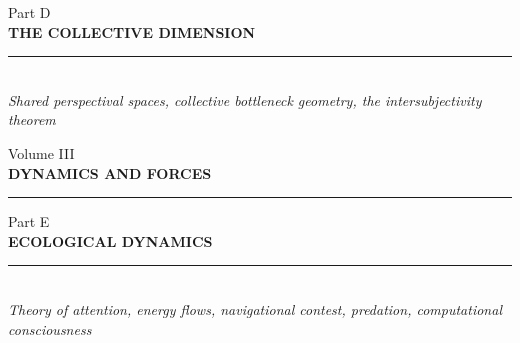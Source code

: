 \documentclass[11pt,letterpaper,openany]{book}
\begin{document}


\clearpage
\thispagestyle{empty}
\vspace*{5cm}
\begin{center}
{\large\sffamily\color{partgray}Part D}\\[0.5cm]
{\Huge\sffamily\bfseries\color{headerblue} THE COLLECTIVE DIMENSION}\\[0.5cm]
{\color{rulegray}\rule{5cm}{0.3pt}}\\[1cm]
{\normalsize\itshape\color{partgray}Shared perspectival spaces, collective bottleneck geometry, the intersubjectivity theorem}
\end{center}
\clearpage
{}






\clearpage
\thispagestyle{empty}
\vspace*{4cm}
\begin{center}
{\large\sffamily\color{partgray}Volume III}\\[0.8cm]
{\fontsize{28}{34}\selectfont\sffamily\bfseries\color{headerblue} DYNAMICS AND FORCES}\\[1cm]
{\color{rulegray}\rule{6cm}{0.4pt}}
\end{center}
\clearpage


\clearpage
\thispagestyle{empty}
\vspace*{5cm}
\begin{center}
{\large\sffamily\color{partgray}Part E}\\[0.5cm]
{\Huge\sffamily\bfseries\color{headerblue} ECOLOGICAL DYNAMICS}\\[0.5cm]
{\color{rulegray}\rule{5cm}{0.3pt}}\\[1cm]
{\normalsize\itshape\color{partgray}Theory of attention, energy flows, navigational contest, predation, computational consciousness}
\end{center}
\clearpage
{}






\end{document}
